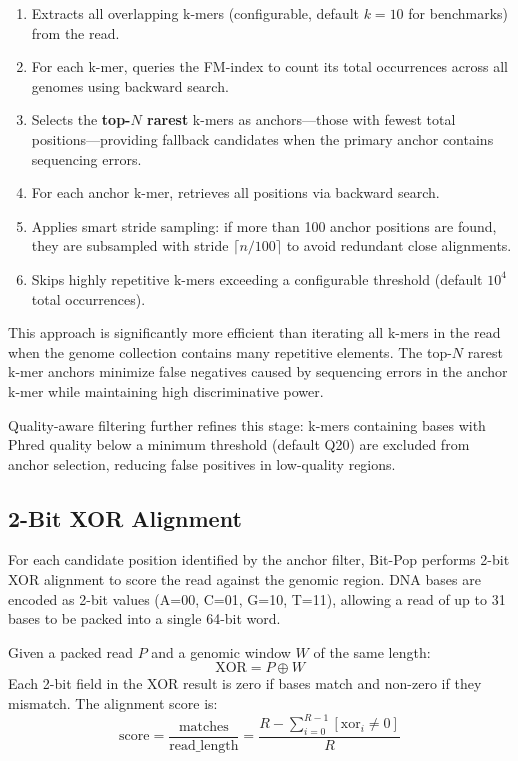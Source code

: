 \documentclass[utf8]{article}
\begin{document}
\begin{enumerate}
    \item Extracts all overlapping k-mers (configurable, default $k=10$ for benchmarks) from the read.
    \item For each k-mer, queries the FM-index to count its total occurrences across all genomes using backward search.
    \item Selects the \textbf{top-$N$ rarest} k-mers as anchors---those with fewest total positions---providing fallback candidates when the primary anchor contains sequencing errors.
    \item For each anchor k-mer, retrieves all positions via backward search.
    \item Applies smart stride sampling: if more than 100 anchor positions are found, they are subsampled with stride $\lceil n/100 \rceil$ to avoid redundant close alignments.
    \item Skips highly repetitive k-mers exceeding a configurable threshold (default $10^4$ total occurrences).
\end{enumerate}

This approach is significantly more efficient than iterating all k-mers in the read when the genome collection contains many repetitive elements. The top-$N$ rarest k-mer anchors minimize false negatives caused by sequencing errors in the anchor k-mer while maintaining high discriminative power.

Quality-aware filtering further refines this stage: k-mers containing bases with Phred quality below a minimum threshold (default Q20) are excluded from anchor selection, reducing false positives in low-quality regions.

\subsection{2-Bit XOR Alignment}

For each candidate position identified by the anchor filter, Bit-Pop performs 2-bit XOR alignment to score the read against the genomic region. DNA bases are encoded as 2-bit values (A=00, C=01, G=10, T=11), allowing a read of up to 31 bases to be packed into a single 64-bit word.

Given a packed read $P$ and a genomic window $W$ of the same length:
\[
\text{XOR} = P \oplus W
\]
Each 2-bit field in the XOR result is zero if bases match and non-zero if they mismatch. The alignment score is:
\[
\text{score} = \frac{\text{matches}}{\text{read\_length}} = \frac{R - \sum_{i=0}^{R-1} [\text{xor}_i \neq 0]}{R}
\]
\end{document}
